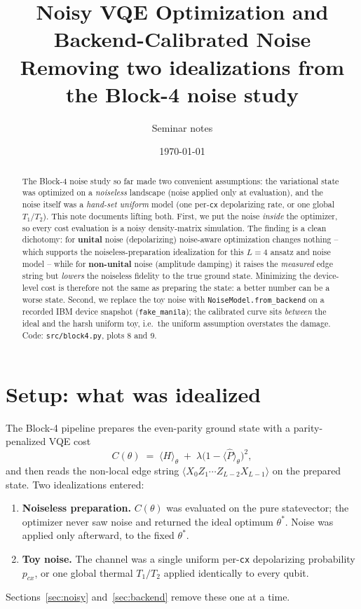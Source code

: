 \documentclass[11pt]{article}
\title{Noisy VQE Optimization and Backend-Calibrated Noise\\
\large Removing two idealizations from the Block-4 noise study}
\author{Seminar notes}
\date{\today}
\newcommand{\Pop}{\hat{P}}
\newcommand{\Oedge}{X_0 Z_1\cdots Z_{L-2} X_{L-1}}
\newcommand{\expv}[1]{\langle #1\rangle}
\newcommand{\cx}{\texttt{cx}}
\begin{document}
\maketitle

\begin{abstract}
The Block-4 noise study so far made two convenient assumptions: the variational
state was optimized on a \emph{noiseless} landscape (noise applied only at
evaluation), and the noise itself was a \emph{hand-set uniform} model (one per-\cx{}
depolarizing rate, or one global $T_1/T_2$). This note documents lifting both.
First, we put the noise \emph{inside} the optimizer, so every cost evaluation is a
noisy density-matrix simulation. The finding is a clean dichotomy: for
\textbf{unital} noise (depolarizing) noise-aware optimization changes nothing --
which supports the noiseless-preparation idealization for this $L=4$ ansatz and
noise model -- while
for \textbf{non-unital} noise (amplitude damping) it raises the \emph{measured} edge
string but \emph{lowers} the noiseless fidelity to the true ground state. Minimizing
the device-level cost is therefore not the same as preparing the state: a better
number can be a worse state. Second, we replace the toy noise with
\texttt{NoiseModel.from\_backend} on a recorded IBM device snapshot
(\texttt{fake\_manila}); the calibrated curve sits \emph{between} the ideal and the
harsh uniform toy, i.e.\ the uniform assumption overstates the damage. Code:
\texttt{src/block4.py}, plots 8 and 9.
\end{abstract}

\section{Setup: what was idealized}

The Block-4 pipeline prepares the even-parity ground state with a
parity-penalized VQE cost
\begin{equation}
  C(\theta) \;=\; \expv{H}_\theta \;+\; \lambda\bigl(1-\expv{\Pop}_\theta\bigr)^2 ,
  \label{eq:cost}
\end{equation}
and then reads the non-local edge string $\expv{\Oedge}$ on the prepared state.
Two idealizations entered:
\begin{enumerate}
  \item \textbf{Noiseless preparation.} $C(\theta)$ was evaluated on the pure
        statevector; the optimizer never saw noise and returned the ideal optimum
        $\theta^\ast$. Noise was applied only afterward, to the fixed $\theta^\ast$.
  \item \textbf{Toy noise.} The channel was a single uniform per-\cx{} depolarizing
        probability $p_{cx}$, or one global thermal $T_1/T_2$ applied identically to
        every qubit.
\end{enumerate}
Sections~\ref{sec:noisy} and~\ref{sec:backend} remove these one at a time.
\end{document}
